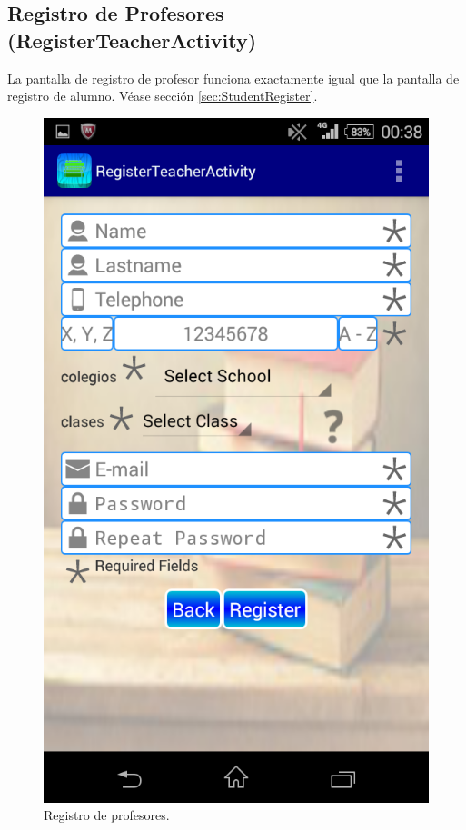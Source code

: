 		\subsection{Registro de Profesores (RegisterTeacherActivity)}
		
			La pantalla de registro de profesor funciona exactamente igual que la pantalla de registro de alumno. Véase sección \ref{sec:StudentRegister}.
		
			\begin{figure}[h !]
				\centering
				\includegraphics[scale=0.2]{Imagenes/App/registroProfe}
				\caption{Registro de profesores.}
				\label{fig:teacherRegister}
			\end{figure}
		
